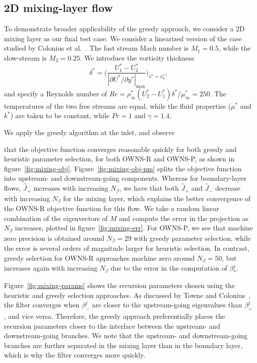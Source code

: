 \subsection{2D mixing-layer flow}

To demonstrate broader applicability of the greedy approach, we consider a 2D mixing layer as our final test case. We consider a linearized version of the case studied by Colonius et al.~\cite{Colonius_1997_ML}. The fast stream Mach number is $M_1 = 0.5$, while the slow-stream is $M_2=0.25$. We introduce the vorticity thickness
\begin{equation}
    \delta^* = \Big(\frac{U_1^* - U_2^*}{|\partial U^* / \partial y^* |_{\max}}\Big)_{x^* = x_0^*},
\end{equation}
and specify a Reynolds number of $Re = \rho_\infty^* (U_2^* - U_1^*) \delta ^* / \mu_\infty^*=250$. The temperatures of the two free streams are equal, while the fluid properties ($\mu^*$ and $k^*$) are taken to be constant, while $Pr=1$ and $\gamma=1.4$.

We apply the greedy algorithm at the inlet, and observe 

that the objective function converges reasonable quickly for both greedy and heuristic parameter selection, for both OWNS-R and OWNS-P, as shown in figure~\ref{fig:mixing-obj}. Figure~\ref{fig:mixing-obj-pm} splits the objective function into upstream- and downstream-going components. Whereas for boundary-layer flows, $\hat{J}_+$ increases with increasing $N_\beta$, we have that both $\hat{J}_+$ and $\hat{J}_-$ decrease with increasing $N_\beta$ for the mixing layer, which explains the better convergence of the OWNS-R objective function for this flow. We take a random linear combination of the eigenvectors of $M$ and compute the error in the projection as $N_\beta$ increases, plotted in figure~\ref{fig:mixing-err}. For OWNS-P, we see that machine zero precision is obtained around $N_\beta=29$ with greedy parameter selection, while the error is several orders of magnitude larger for heuristic selection. In contrast, greedy selection for OWNS-R approaches machine zero around $N_\beta=50$, but increases again with increasing $N_\beta$ due to the error in the computation of $\beta_*^j$. 

Figure~\ref{fig:mixing-params} shows the recursion parameters chosen using the heuristic and greedy selection approaches. As discussed by Towne and Colonius~\cite{Towne_2015_OWNS-O}, the filter converges when $\beta_-^j$ are closer to the upstream-going eigenvalues than $\beta_+^j$, and vice versa. Therefore, the greedy approach preferentially places the recursion parameters closer to the interface between the upstream- and downstream-going branches. We note that the upstream- and downstream-going branches are further separated in the mixing layer than in the boundary layer, which is why the filter converges more quickly.



